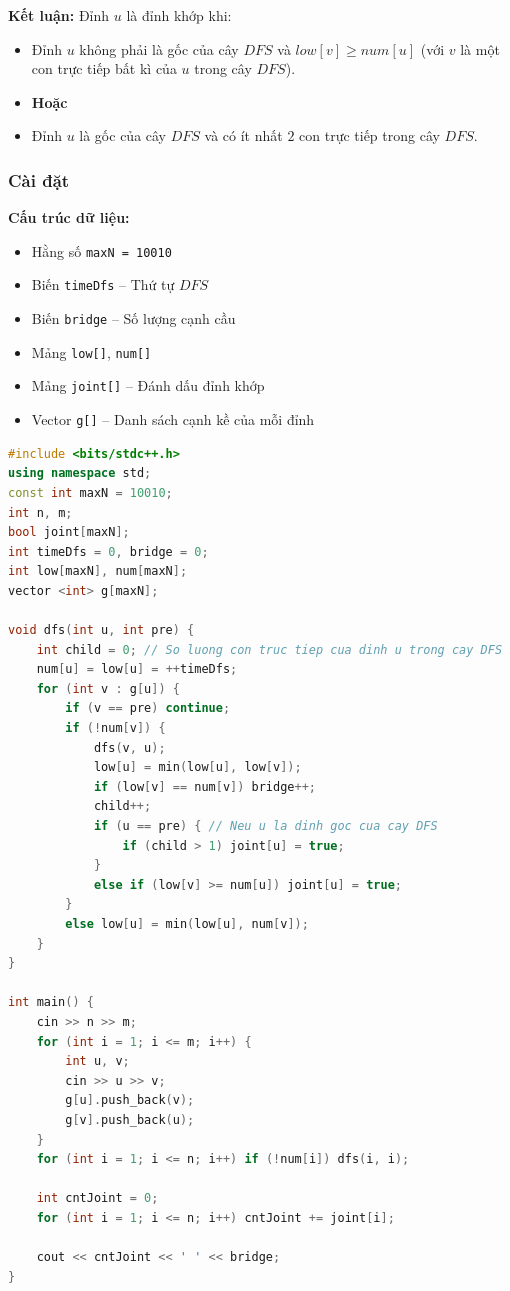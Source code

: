 \documentclass{article}
\begin{document}
\textbf{Kết luận:} Đỉnh $u$ là đỉnh khớp khi:
\begin{itemize}
    \item Đỉnh $u$ không phải là gốc của cây $DFS$ và $low[v] \geq num[u]$ (với $v$ là một con trực tiếp bất kì của $u$ trong cây $DFS$).
    \item \textbf{Hoặc}
    \item Đỉnh $u$ là gốc của cây $DFS$ và có ít nhất $2$ con trực tiếp trong cây $DFS$.
\end{itemize}

\subsubsection*{Cài đặt}

\textbf{Cấu trúc dữ liệu:}
\begin{itemize}
    \item Hằng số \texttt{maxN = 10010}
    \item Biến \texttt{timeDfs} -- Thứ tự $DFS$
    \item Biến \texttt{bridge} -- Số lượng cạnh cầu
    \item Mảng \texttt{low[]}, \texttt{num[]}
    \item Mảng \texttt{joint[]} -- Đánh dấu đỉnh khớp
    \item Vector \texttt{g[]} -- Danh sách cạnh kề của mỗi đỉnh
\end{itemize}

\begin{lstlisting}[language=C++, caption={Cài đặt, độ phức tạp $O(n + m)$}]
#include <bits/stdc++.h>
using namespace std;
const int maxN = 10010;
int n, m;
bool joint[maxN];
int timeDfs = 0, bridge = 0;
int low[maxN], num[maxN];
vector <int> g[maxN];

void dfs(int u, int pre) {
    int child = 0; // So luong con truc tiep cua dinh u trong cay DFS
    num[u] = low[u] = ++timeDfs;
    for (int v : g[u]) {
        if (v == pre) continue;
        if (!num[v]) {
            dfs(v, u);
            low[u] = min(low[u], low[v]);
            if (low[v] == num[v]) bridge++;
            child++;
            if (u == pre) { // Neu u la dinh goc cua cay DFS
                if (child > 1) joint[u] = true;
            }
            else if (low[v] >= num[u]) joint[u] = true;
        }
        else low[u] = min(low[u], num[v]);
    }
}

int main() {
    cin >> n >> m;
    for (int i = 1; i <= m; i++) {
        int u, v;
        cin >> u >> v;
        g[u].push_back(v);
        g[v].push_back(u);
    }
    for (int i = 1; i <= n; i++) if (!num[i]) dfs(i, i);

    int cntJoint = 0;
    for (int i = 1; i <= n; i++) cntJoint += joint[i];

    cout << cntJoint << ' ' << bridge;
}
\end{lstlisting}
\end{document}
